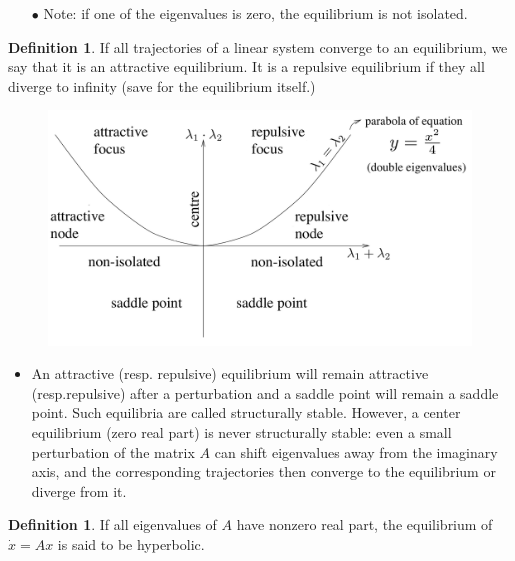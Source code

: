 \documentclass[12pt, openany]{report}
\theoremstyle{definition}
\newtheorem{definition}[thm]{Definition}
\begin{document}
\begin{itemize}
    \item [\(\bullet\)] Note: if one of the eigenvalues is zero, the equilibrium is not isolated.
\end{itemize}
\begin{definition}
    If all trajectories of a linear system converge to an equilibrium, we say that it is an attractive equilibrium. It is a repulsive equilibrium if they all diverge to infinity (save for the equilibrium itself.)
\end{definition}
\begin{figure}[H]
    \centering
    \includegraphics[width=.5\textwidth]{img/det_tr_2d.png}
\end{figure}
\begin{itemize}
    \item An attractive (resp. repulsive) equilibrium will remain attractive (resp.repulsive) after a perturbation and a saddle point will remain a saddle point. Such equilibria are called structurally stable. However, a center equilibrium (zero real part) is never structurally stable: even a small perturbation of the matrix \(A\) can shift eigenvalues away from the imaginary axis, and the corresponding trajectories then converge to the equilibrium or diverge from it.
\end{itemize}
\begin{definition}
    If all eigenvalues of \(A\) have nonzero real part, the equilibrium of \(\dot x=Ax\) is said to be hyperbolic.
\end{definition}
\end{document}
